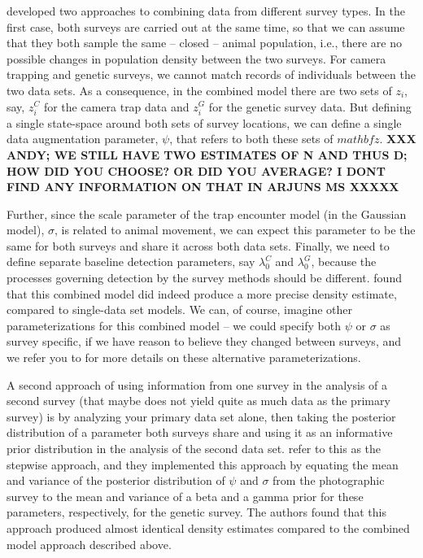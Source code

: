 \citet{gopalaswamy_etal:2012mee} developed two approaches to combining
data from different survey types. In the first case, both surveys are
carried out at the same time, so that we can assume that they both
sample the same -- closed -- animal population, i.e., there are no
possible changes in population density between the two surveys. For
camera trapping and genetic surveys, we cannot match records of
individuals between the two data sets. As a consequence, in the
combined model there are two sets of $z_i$, say, $z^{C}_{i}$ for the
camera trap data and $z^{G}_{i}$ for the genetic survey data. But
defining a single state-space around both sets of survey locations, we
can define a single data augmentation parameter, $\psi$, that refers to
both these sets of $mathbf{z}$.  {\bf XXX ANDY; WE STILL HAVE TWO ESTIMATES
OF N AND THUS D; HOW DID YOU CHOOSE? OR DID YOU AVERAGE? I DONT FIND
ANY INFORMATION ON THAT IN ARJUNS MS XXXXX}

Further, since the scale parameter of the trap encounter model (in
\citet{gopalaswamy_etal:2012mee} the Gaussian model), $\sigma$, is
related to animal movement, we can expect this parameter to be the
same for both surveys and share it across both data sets. Finally, we
need to define separate baseline detection parameters, say
$\lambda_{0}^{C}$ and $\lambda_{0}^{G}$, because the processes
governing detection by the survey methods should be
different. \citet{gopalaswamy_etal:2012mee} found that this combined
model did indeed produce a more precise density estimate, compared to
single-data set models.  We can, of course, imagine other
parameterizations for this combined model -- we could specify both
$\psi$ or $\sigma$ as survey specific, if we have reason to believe
they changed between surveys, and we refer you to
\citet{gopalaswamy_etal:2012mee} for more details on these alternative
parameterizations.

A second approach of using information from one survey in the analysis
of a second survey (that maybe does not yield quite as much data as
the primary survey) is by analyzing your primary data set alone, then
taking the posterior distribution of a parameter both surveys share
and using it as an informative prior distribution in the analysis of
the second data set. \citet{gopalaswamy_etal:2012mee} refer to this as
the stepwise approach, and they implemented this approach by equating
the mean and variance of the posterior distribution of $\psi$ and
$\sigma$ from the photographic survey to the mean and variance of a
beta and a gamma prior for these parameters, respectively, for the
genetic survey. The authors found that this approach produced almost
identical density estimates compared to the combined model approach
described above.

